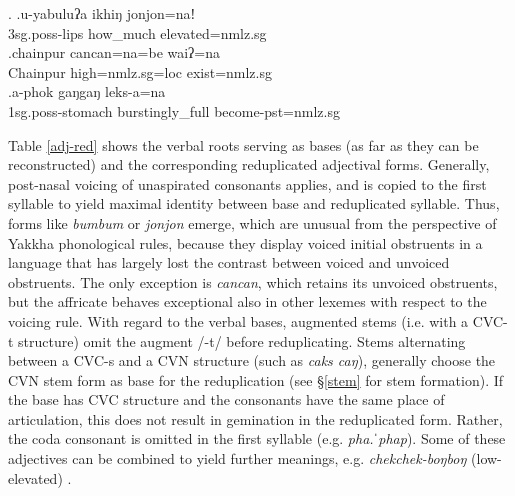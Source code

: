 \ex. \ag.u-yabuluʔa ikhiŋ jonjon=naǃ\\
		{\sc 3sg.poss}-lips how\_much elevated{\sc =nmlz.sg}\\
 	\bg.chainpur cancan=na=be waiʔ=na\\
	Chainpur high{\sc =nmlz.sg=loc} exist{\sc [3sg]=nmlz.sg}		\\
		\bg.a-phok gaŋgaŋ leks-a=na\\
	{\sc 1sg.poss}-stomach burstingly\_full  become{\sc [3sg]-pst=nmlz.sg}		\\

 Table \ref{adj-red}  shows the verbal roots serving as bases (as far as they can be reconstructed) and the corresponding reduplicated adjectival forms. Generally, post-nasal voicing of unaspirated consonants applies, and is copied to the first syllable to yield maximal identity between base and reduplicated syllable. Thus, forms like \emph{bumbum} or \emph{jonjon} emerge, which are unusual from the perspective of Yakkha phonological rules, because they display voiced initial obstruents in a language that has largely lost the contrast between voiced and unvoiced obstruents. The only exception is \emph{cancan}, which retains its unvoiced obstruents, but the affricate behaves exceptional also in other lexemes with respect to the voicing rule. With regard to the verbal bases, augmented stems (i.e. with a CVC-t structure) omit the augment /-t/ before reduplicating. Stems alternating between a CVC-s and a CVN structure (such as \emph{caks \ti caŋ}), generally choose the CVN stem form as base for the reduplication (see  §\ref{stem} for stem formation). If the base has CVC structure and the consonants have the same place of articulation, this does not result in gemination in the reduplicated form. Rather, the coda consonant is omitted in the first syllable (e.g. \emph{pha.ˈphap}). Some of these adjectives can be combined to yield further meanings, e.g. \emph{chekchek-boŋboŋ} (low-elevated) . 

